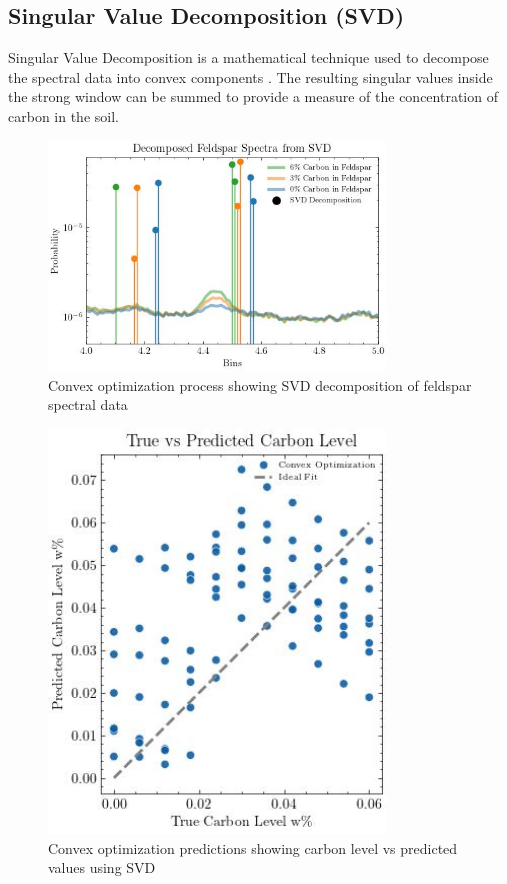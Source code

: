 \documentclass[review]{elsarticle}
\begin{document}
\subsection{Singular Value Decomposition (SVD)}

Singular Value Decomposition is a mathematical technique used to decompose the spectral data into convex components \cite{liu_deconvolution_2020}. The resulting singular values inside the strong window can be summed to provide a measure of the concentration of carbon in the soil.

\begin{figure}[H]
\centering
\includegraphics[width=0.8\textwidth]{../Figures/Analysis/decomposed_feldspar_svd.jpg}
\caption{Convex optimization process showing SVD decomposition of feldspar spectral data}
\label{fig:svd_decomposition}
\end{figure}

\begin{figure}[H]
\centering
\includegraphics[width=0.8\textwidth]{../Figures/Analysis/carbon_level_vs_predicted_convex_optimization.jpg}
\caption{Convex optimization predictions showing carbon level vs predicted values using SVD}
\label{fig:svd_predictions}
\end{figure}
\end{document}
